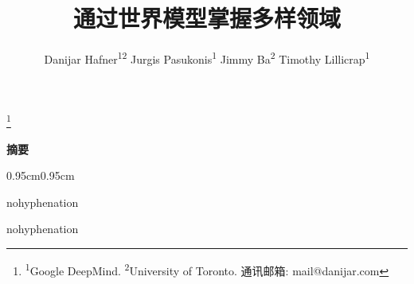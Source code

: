 \documentclass[12pt]{article}
\title{\vspace*{-2.5ex}\bfseries 通过世界模型掌握多样领域}
\date{}
\author{
Danijar Hafner\rlap{,}\textsuperscript{12}\enskip
Jurgis Pasukonis\rlap{,}\textsuperscript{1}\enskip
Jimmy Ba\rlap{,}\textsuperscript{2}\enskip
Timothy Lillicrap\textsuperscript{1}}
\begin{document}
\pagestyle{fancy}

\vspace{-4ex}
\maketitle
\thispagestyle{first}

\enlargethispage{1.5\baselineskip}
{\renewcommand\thefootnote{}\footnote{
\textsuperscript{1}Google DeepMind.\enskip
\textsuperscript{2}University of Toronto.\enskip
通讯邮箱: mail@danijar.com}}
\addtocounter{footnote}{-1}

\vspace{-6ex}
\begin{center}\bfseries
\vspace{-.5ex}
摘要
\vspace{-.2ex}
\end{center}
\begin{adjustwidth}{0.95cm}{0.95cm}
\begin{hyphenrules}{nohyphenation}
\ignorespaces

\end{hyphenrules}
\end{adjustwidth}
\vspace{2ex}

\vfill

\vfill
\clearpage








\clearpage
\begin{hyphenrules}{nohyphenation}
\setlength{\bibsep}{.5ex plus .8ex}

\end{hyphenrules}

\clearpage
\appendix


\end{document}
